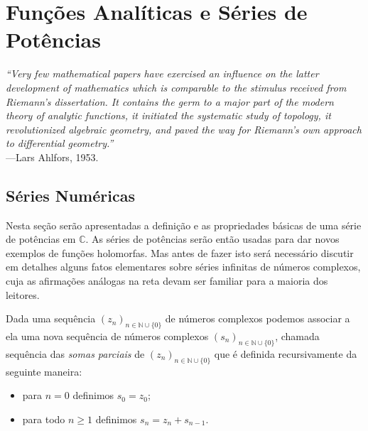 \chapter[Funções Analíticas e Séries de Potências]{Funções Analíticas e Séries de Potências}
\chaptermark{}


\hfill%
\begin{minipage}{12cm}
	\begin{flushright}
		\rightskip=0.5cm
		\textit{``Very few mathematical papers have exercised an influence on 
		the latter development of mathematics which is comparable to the stimulus
		received from Riemann's dissertation. It contains the germ to a major part
		of the modern theory of analytic functions, it initiated the systematic
		study of topology, it revolutionized algebraic geometry, and paved the way
		for Riemann's own approach to differential geometry.''}
		\\[0.1cm]
		\rightskip=0.5cm
		---Lars Ahlfors, 1953.
	\end{flushright}
\end{minipage}





\section{Séries Numéricas}

Nesta seção serão apresentadas a definição e as propriedades básicas de uma
série de potências em $\mathbb{C}$. As séries de potências serão então usadas
para dar novos exemplos de funções holomorfas. Mas antes de fazer isto será 
necessário discutir em detalhes alguns fatos elementares sobre séries infinitas
de números complexos, cuja as afirmações análogas na reta devam ser familiar 
para a maioria dos leitores. 



\bigskip 

Dada uma sequência $(z_n)_{n\in\mathbb{N}\cup\{0\}}$ de números complexos podemos associar a ela 
uma nova sequência de números complexos $(s_n)_{n\in\mathbb{N}\cup\{0\}}$, chamada sequência das \textit{somas parciais}
de $(z_n)_{n\in\mathbb{N}\cup\{0\}}$ que é definida recursivamente da seguinte maneira: 
\begin{itemize}
	\item para $n=0$ definimos $s_0 = z_0$;
	\item para todo $n\geqslant 1$ definimos $s_{n}=z_n+s_{n-1}$.
\end{itemize}

